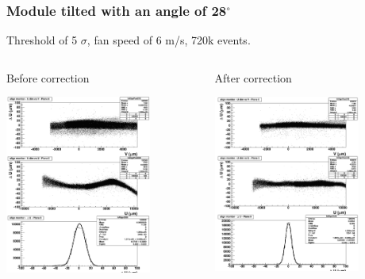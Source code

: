 \documentclass{beamer}
\newcommand{\degres}{\ensuremath{^\circ}}
\begin{document}
\begin{frame}
  \frametitle{Module tilted with an angle of 28\degres}

  \vspace{-0.35cm}
  Threshold of 5 $\sigma$, fan speed of 6 m/s, 720k events.

  \vspace{-0.35cm}
  \begin{columns}[c]
    \begin{column}{5cm}
      \begin{block}{Before correction}
        \begin{center}
          \includegraphics[width = 4.8cm]{Pictures/RsAlign_226021_pl6_deformed2.png}
        \end{center}

        \vspace{-0.54cm}
      \end{block}
    \end{column}

    \begin{column}{5cm}
      \begin{block}{After correction}
        \begin{center}
          \includegraphics[width = 4.8cm]{Pictures/RsAlign_226021_pl6_corrected2.png}
        \end{center}

        \vspace{-0.52cm}
      \end{block}
    \end{column}
  \end{columns}

\end{frame}
\end{document}
